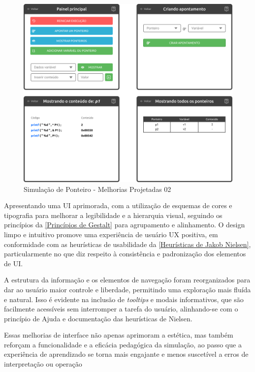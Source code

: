 \begin{figure}[htb]
    \begin{center}
        \includegraphics[scale=0.25]{figs/debugandoED-ponteiro-depois-02.png}
    \end{center}
    \caption{\label{debugandoED-ponteiro-depois-02}Simulação de Ponteiro - Melhorias Projetadas 02}
\end{figure}

Apresentando uma \ac{UI} aprimorada, com a utilização de esquemas de cores e tipografia para melhorar a legibilidade e a hierarquia visual, seguindo os princípios da \autoref{Princípios de Gestalt} para agrupamento e alinhamento. O design limpo e intuitivo promove uma experiência de usuário \ac{UX} positiva, em conformidade com as heurísticas de usabilidade da \autoref{Heurísticas de Jakob Nielsen}, particularmente no que diz respeito à consistência e padronização dos elementos de \ac{UI}.

A estrutura da informação e os elementos de navegação foram reorganizados para dar ao usuário maior controle e liberdade, permitindo uma exploração mais fluída e natural. Isso é evidente na inclusão de \textit{tooltips} e modais informativos, que são facilmente acessíveis sem interromper a tarefa do usuário, alinhando-se com o princípio de Ajuda e documentação das heurísticas de Nielsen.

Essas melhorias de interface não apenas aprimoram a estética, mas também reforçam a funcionalidade e a eficácia pedagógica da simulação, ao passo que a experiência de aprendizado se torna mais engajante e menos suscetível a erros de interpretação ou operação

